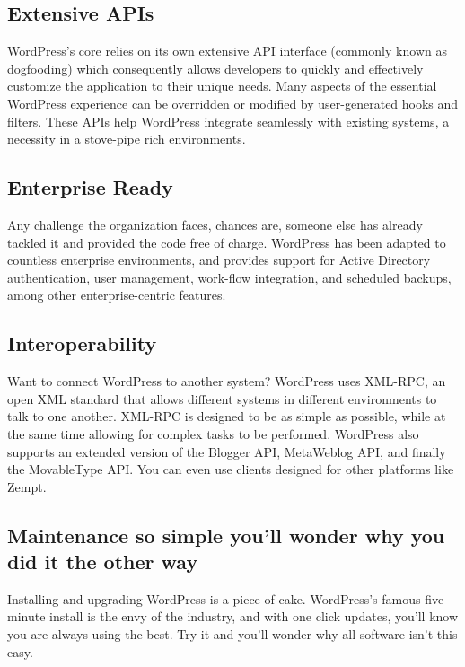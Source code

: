 \subsection{Extensive APIs}

WordPress’s core relies on its own extensive API interface (commonly known as dogfooding) which consequently allows developers to quickly and effectively customize the application to their unique needs. Many aspects of the essential WordPress experience can be overridden or modified by user-generated hooks and filters. These APIs help WordPress integrate seamlessly with existing systems, a necessity in a stove-pipe rich environments.

\subsection{Enterprise Ready}

Any challenge the organization faces, chances are, someone else has already tackled it and provided the code free of charge. WordPress has been adapted to countless enterprise environments, and provides support for Active Directory authentication, user management, work-flow integration, and scheduled backups, among other enterprise-centric features.

\subsection{Interoperability}

Want to connect WordPress to another system? WordPress uses XML-RPC, an open XML standard that allows different systems in different environments to talk to one another. XML-RPC is designed to be as simple as possible, while at the same time allowing for complex tasks to be performed. WordPress also supports an extended version of the Blogger API, MetaWeblog API, and finally the MovableType API. You can even use clients designed for other platforms like Zempt.

\subsection{Maintenance so simple you’ll wonder why you did it the other way}

Installing and upgrading WordPress is a piece of cake. WordPress’s famous five minute install is the envy of the industry, and with one click updates, you’ll know you are always using the best. Try it and you’ll wonder why all software isn’t this easy.

